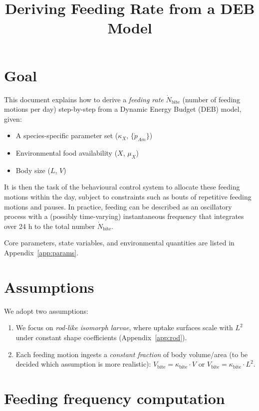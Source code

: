 \documentclass[11pt]{article}
\title{Deriving Feeding Rate from a DEB Model}
\author{}
\date{}
\begin{document}
\maketitle

\section{Goal}

This document explains how to derive a \emph{feeding rate} $\dot N_{\text{bite}}$ (number of feeding motions per day) step-by-step from a Dynamic Energy Budget (DEB) model, given:
\begin{itemize}
  \item A species-specific parameter set ($\kappa_X$, $\{\dot{p}_{Am}\}$)
  \item Environmental food availability ($X$, $\mu_X$)
  \item Body size ($L$, $V$)
\end{itemize}

It is then the task of the behavioural control system to allocate these feeding motions within the day, subject to constraints such as bouts of repetitive feeding motions and pauses. In practice, feeding can be described as an oscillatory process with a (possibly time-varying) instantaneous frequency that integrates over 24 h to the total number $\dot N_{\text{bite}}$.

Core parameters, state variables, and environmental quantities are listed in Appendix~\ref{app:params}.

\section{Assumptions}

We adopt two assumptions:
\begin{enumerate}
  \item We focus on \emph{rod-like isomorph larvae}, where uptake surfaces scale with $L^2$ under constant shape coefficients (Appendix~\ref{app:rod}).
  \item Each feeding motion ingests a \emph{constant fraction} of body volume/area (to be decided which assumption is more realistic): $V_{\text{bite}} = \kappa_{\text{bite}} \cdot V$ or $V_{\text{bite}} = \kappa_{\text{bite}} \cdot L^2$.
\end{enumerate}

\section{Feeding frequency computation}
\end{document}
